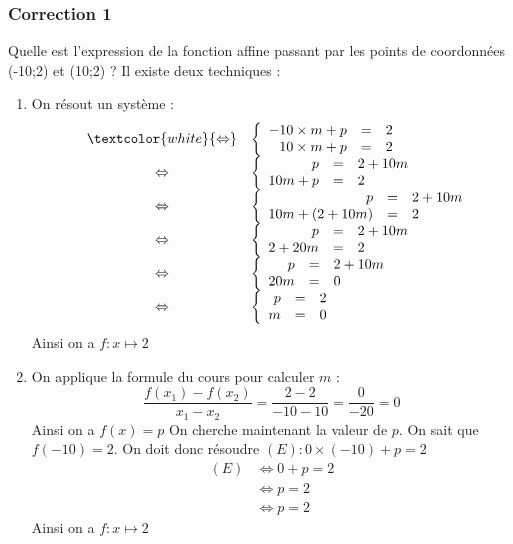\documentclass[15pt, mathserif]{beamer}
\begin{document}
\begin{frame}
\vspace{-10mm}
	\frametitle{Correction 1}
\vspace*{1cm} 
 \footnotesize{Quelle est l'expression de la fonction affine passant par les points de coordonnées (-10;2) et (10;2) ? Il existe deux techniques :} 
 \begin{multicols}{2} 
 \begin{enumerate} 
 \item On résout un système : $$ \begin{array}{rcl} 
 & \textcolor{white}{\Leftrightarrow} & 
 \left 
 \{\begin{array}{rcl}-10\times m + p&=&2 \\ 
 10\times m+p&=&2\end{array} \right. \\ 
 &\Leftrightarrow & \left 
 \{\begin{array}{rcl} p&=&2+10m \\ 
 10m+p&=&2\end{array} \right. \\ 
 &\Leftrightarrow & \left 
 \{\begin{array}{rcl} p&=&2+10m \\ 
 10m+(2+10m) &=&2\end{array} \right. \\ &\Leftrightarrow& \left \{\begin{array}{rcl}p&=&2+10m \\ 
 2+20m&=&2\end{array} \right. \\ &\Leftrightarrow& \left \{\begin{array}{rcl}p&=&2+10m \\ 
 20m&=&0\end{array} \right. \\  &\Leftrightarrow& \left \{\begin{array}{rcl} p&=&2 \\  m&=&0\end{array}\right. \end{array}$$ 
 Ainsi on a $f:x\mapsto 2$ 
 \columnbreak 
 \item 
 \footnotesize{On applique la formule du cours pour calculer $m$ :$$ \dfrac{f(x_1)-f(x_2)}{x_1-x_2}=\dfrac{2-2}{-10-10}= \dfrac{0}{-20}=0$$} \footnotesize{ Ainsi on a $f(x)= p$
  On cherche maintenant la valeur de $p$. On sait que $f(-10)=2$. On doit donc résoudre $(E): 0\times\left(-10\right)+p=2$}	 
 \begin{align*} (E)& \Leftrightarrow 0+p=2\\
		 	 & \Leftrightarrow p=2\\
			 & \Leftrightarrow p=2
	 \end{align*} 
 Ainsi on a $f:x\mapsto 2$ 
 \end{enumerate} 
 \end{multicols} 
 \end{frame}
\end{document}
